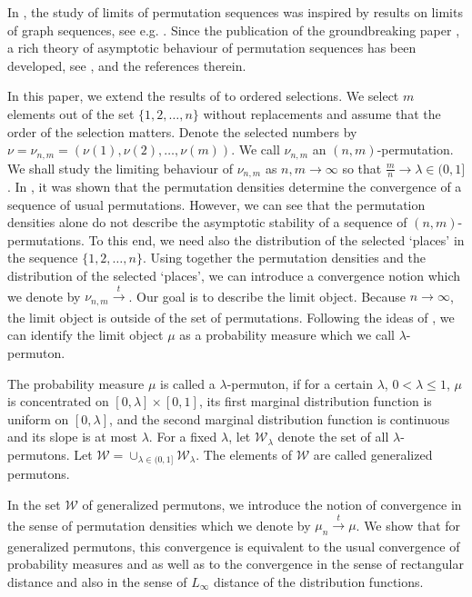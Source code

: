 \documentclass[12pt,twoside]{article}
\theoremstyle{definition}
\theoremstyle{remark}
\numberwithin{equation}{section}
\theoremstyle{plain}
\theoremstyle{remark}
\def\WD{{\mathcal W}}
\begin{document}
In \cite{Hoppen}, the study of limits of permutation sequences was inspired by results on limits of graph sequences,
see e.g. \cite{LoSze}.
Since the publication of the groundbreaking paper \cite{Hoppen},
a rich theory of asymptotic behaviour of permutation sequences has been developed, see 
\cite{Bassino}, \cite{Alon} and the references therein.

In this paper, we extend the results of \cite{Hoppen} to ordered selections.
We select $m$ elements out of the set $\{1,2,\dots , n\}$ without replacements and 
assume that the order of the selection matters.
Denote the selected numbers by $\nu= \nu_{n,m} =(\nu(1), \nu(2), \dots , \nu(m))$.
We call $\nu_{n,m}$ an $(n,m)$-permutation.
We shall study the limiting behaviour of $\nu_{n,m}$ as $n,m \to \infty$ so that 
$\frac{m}{n}  \to \lambda \in (0,1]$.
In \cite{Hoppen}, it was shown that the permutation densities determine the convergence of a
sequence of usual permutations.  
However, we can see that the permutation densities alone do not describe the asymptotic stability
of a sequence of $(n,m)$-permutations.
To this end, we need also the distribution of the selected `places' in
the sequence $\{1,2,\dots , n\}$.
Using together the permutation densities and the distribution of the selected `places',
we can introduce a convergence notion which we denote by $\nu_{n,m} \xrightarrow[]{t} $.
Our goal is to describe the limit object.
Because $n \to \infty$, the limit object is outside of the set of permutations.
Following the ideas of \cite{Hoppen}, we can identify the limit object $\mu$ as a 
probability measure which we call $\lambda$-permuton.

The probability measure $\mu$ is called a  $\lambda$-permuton, 
if for a certain $\lambda$, $0<\lambda\le 1$,
$\mu$ is concentrated on $[0, \lambda] \times [0,1]$,
its first marginal distribution function is uniform on $[0, \lambda]$, 
and the second marginal distribution function is continuous and its slope is at most $\lambda$.
For a fixed $\lambda$, let $\WD_{\lambda}$ denote the set of all $\lambda$-permutons.
Let $\WD = \cup_{\lambda\in (0,1]} \WD_{\lambda}$.
The elements of $\WD$ are called generalized permutons.

In the set $\WD$ of generalized permutons, we introduce the notion of convergence in the sense of 
permutation densities which we denote by $\mu_n \xrightarrow[]{t} \mu$.
We show that for generalized permutons, this convergence is equivalent to the usual convergence of
 probability measures and as well as to the convergence in the sense of rectangular distance 
 and also in the sense of $L_\infty$ distance of the distribution functions.
\end{document}
